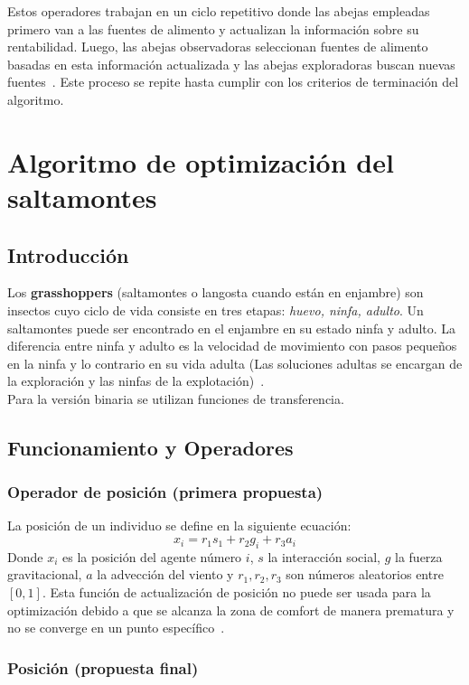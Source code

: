 Estos operadores trabajan en un ciclo repetitivo donde las abejas empleadas primero van a las fuentes de alimento y actualizan la información sobre su rentabilidad. Luego, las abejas observadoras seleccionan fuentes de alimento basadas en esta información actualizada y las abejas exploradoras buscan nuevas fuentes~\cite{karaboga_idea_nodate}. Este proceso se repite hasta cumplir con los criterios de terminación del algoritmo.

\section{Algoritmo de optimización del saltamontes}
\subsection{Introducción}
Los \textbf{grasshoppers} (saltamontes o langosta cuando están en enjambre) son insectos cuyo ciclo de vida consiste en tres etapas: \textit{huevo, ninfa, adulto}. Un saltamontes puede ser encontrado en el enjambre en su estado ninfa y adulto. La diferencia entre ninfa y adulto es la velocidad de movimiento con pasos pequeños en la ninfa y lo contrario en su vida adulta (Las soluciones adultas se encargan de la exploración y las ninfas de la explotación)~\cite{saremi_grasshopper_2017}.\\[6pt]
Para la versión binaria se utilizan funciones de transferencia.
\subsection{Funcionamiento y Operadores}
\subsubsection{Operador de posición (primera propuesta)}
La posición de un individuo se define en la siguiente ecuación:
\begin{equation}
    x_i = r_1s_1+r_2g_i+r_3a_i
\end{equation}
Donde $x_i$ es la posición del agente número $i$, $s$ la interacción social, $g$ la fuerza gravitacional, $a$ la advección del viento y $r_1, r_2, r_3$ son números aleatorios entre $[0,1]$.
Esta función de actualización de posición no puede ser usada para la optimización debido a que se alcanza la zona de comfort de manera prematura y no se converge en un punto específico~\cite{saremi_grasshopper_2017}.

\subsubsection{Posición (propuesta final)}

